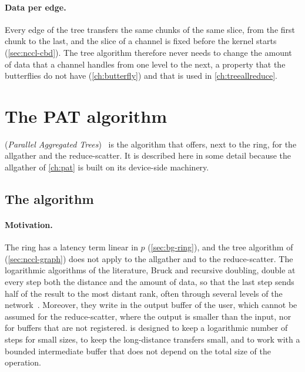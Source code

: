 \paragraph{Data per edge.}
Every edge of the tree transfers the same chunks of the same slice, from the first chunk to the last, and the slice of a channel is fixed before the kernel starts (\cref{sec:nccl-cbd}).
The tree algorithm therefore never needs to change the amount of data that a channel handles from one level to the next, a property that the butterflies do not have (\cref{ch:butterfly}) and that is used in \cref{ch:treeallreduce}.
\section{The PAT algorithm}\label{sec:nccl-pat}

\pat{} (\emph{Parallel Aggregated Trees})~\cite{jeaugey2025pat} is the algorithm that \nccl{} offers, next to the ring, for the allgather and the reduce-scatter.
It is described here in some detail because the allgather of \cref{ch:pat} is built on its device-side machinery.

\subsection{The algorithm}

\paragraph{Motivation.}
The ring has a latency term linear in $p$ (\cref{sec:bg-ring}), and the tree algorithm of \nccl{} (\cref{sec:nccl-graph}) does not apply to the allgather and to the reduce-scatter.
The logarithmic algorithms of the literature, Bruck and recursive doubling, double at every step both the distance and the amount of data, so that the last step sends half of the result to the most distant rank, often through several levels of the network~\cite{jeaugey2025pat}.
Moreover, they write in the output buffer of the user, which cannot be assumed for the reduce-scatter, where the output is smaller than the input, nor for buffers that are not registered.
\pat{} is designed to keep a logarithmic number of steps for small sizes, to keep the long-distance transfers small, and to work with a bounded intermediate buffer that does not depend on the total size of the operation.

